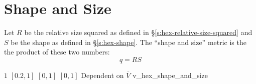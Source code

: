 \section{Shape and Size\label{s:hex-shape-and-size}}

Let $R$ be the relative size squared as defined in \S\ref{s:hex-relative-size-squared}
and $S$ be the shape as defined in \S\ref{s:hex-shape}.
The ``shape and size'' metric is the the product of these two numbers:
\[
  q = RS
\]

%
{$1$}%
{$[0.2,1]$}%
{$[0,1]$}%
{$[0,1]$}%
{Dependent on $\overline{V}$}%
{\cite{knu:03}}%
{v\_hex\_shape\_and\_size}%
